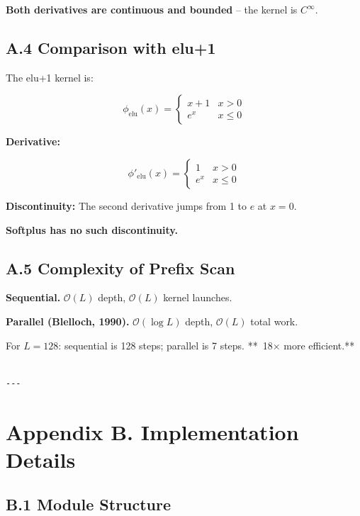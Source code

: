 \textbf{Both derivatives are continuous and bounded} -- the kernel is $C^\infty$.

\subsection{A.4 Comparison with elu+1}

The elu+1 kernel is:

\[
\phi_{\text{elu}}(x) = \begin{cases} x + 1 & x > 0 \\ e^x & x \le 0 \end{cases}
\tag{A.7}
\]

\textbf{Derivative:}

\[
\phi'_{\text{elu}}(x) = \begin{cases} 1 & x > 0 \\ e^x & x \le 0 \end{cases}
\tag{A.8}
\]

\textbf{Discontinuity:} The second derivative jumps from 1 to $e$ at $x = 0$.

\textbf{Softplus has no such discontinuity.}

\subsection{A.5 Complexity of Prefix Scan}

\textbf{Sequential.} $\mathcal{O}(L)$ depth, $\mathcal{O}(L)$ kernel launches.

\textbf{Parallel (Blelloch, 1990).} $\mathcal{O}(\log L)$ depth, $\mathcal{O}(L)$ 
total work.

For $L = 128$: sequential is 128 steps; parallel is 7 steps. **~18$\times$ more 
efficient.**
\begin{lstlisting}

---
\end{lstlisting}


\section{Appendix B. Implementation Details}

\subsection{B.1 Module Structure}

